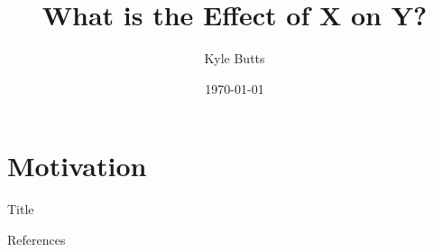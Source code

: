 \documentclass[aspectratio=169,t]{beamer}
\title{What is the Effect of X on Y?}
\date{\today}
\author{Kyle Butts}
\begin{document}
\begin{frame}
\maketitle

\end{frame}

\section{Motivation}

\begin{frame}{Title}
  
\end{frame}


\begin{frame}[allowframebreaks]{References}
  \printbibliography
\end{frame}
\appendix
\end{document}

